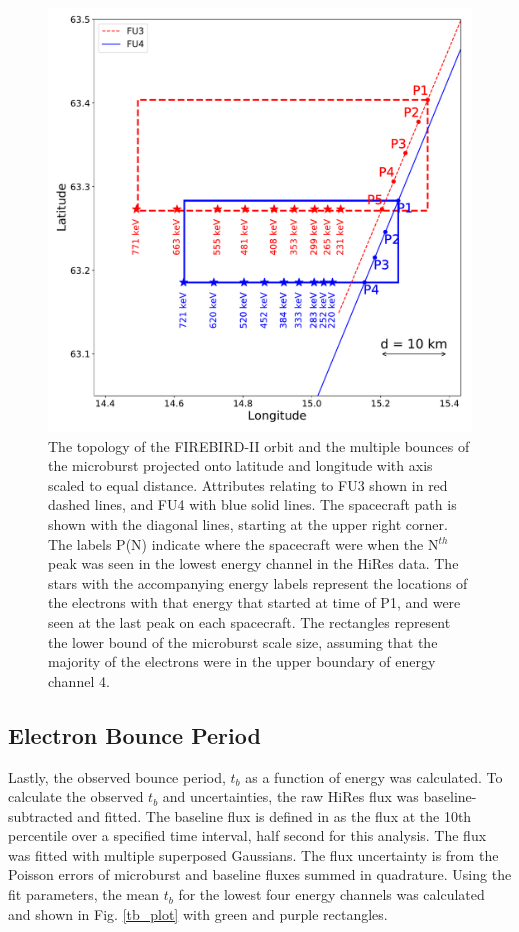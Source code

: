 \documentclass[draft,linenumbers]{agujournal}
\begin{document}
\begin{figure}
\includegraphics[width=\textwidth]{decay_microburst_distance_corrected_CH4_last_pk_drift_color_2.pdf}
\caption{The topology of the FIREBIRD-II orbit and the multiple bounces of the microburst projected onto latitude and longitude with axis scaled to equal distance. Attributes relating to FU3 shown in red dashed lines, and FU4 with blue solid lines. The spacecraft path is shown with the diagonal lines, starting at the upper right corner. The labels P(N) indicate where the spacecraft were when the N$^{th}$ peak was seen in the lowest energy channel in the HiRes data. The stars with the accompanying energy labels represent the locations of the electrons with that energy that started at time of P1, and were seen at the last peak on each spacecraft. The rectangles represent the lower bound of the microburst scale size, assuming that the majority of the electrons were in the upper boundary of energy channel 4.}
\label{map_plot}
\end{figure}

\subsection{Electron Bounce Period} \label{t_b} %
Lastly, the observed bounce period, $t_b$ as a function of energy was calculated. To calculate the observed $t_b$ and uncertainties, the raw HiRes flux was baseline-subtracted and fitted. The baseline flux is defined in \citet{O'Brien04} as the flux at the 10th percentile over a specified time interval, half second for this analysis. The flux was fitted with multiple superposed Gaussians. The flux uncertainty is from the Poisson errors of microburst and baseline fluxes summed in quadrature. Using the fit parameters, the mean $t_b$ for the lowest four energy channels was calculated and shown in Fig. \ref{tb_plot} with green and purple rectangles. 
\end{document}
